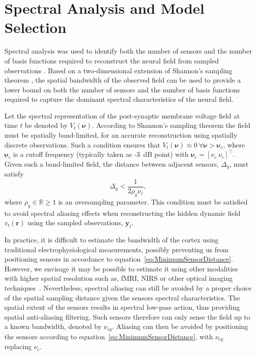 \documentclass[10pt,a4paper]{article}
\begin{document}
\section{Spectral Analysis and Model Selection}\label{SpectralAnalysisSection} Spectral analysis was used to identify both the number of sensors and the number of basis functions required to reconstruct the neural field from sampled observations \cite{Sanner1992,Scerri2009}. Based on a two-dimensional extension of Shannon's sampling theorem \cite{Peterson1962}, the spatial bandwidth of the observed field can be used to provide a lower bound on both the number of sensors and the number of basis functions required to capture the dominant spectral characteristics of the neural field.

Let the spectral representation of the post-synaptic membrane voltage field at time $t$ be denoted by $V_t(\boldsymbol{\nu})$. According to Shannon's sampling theorem the field must be spatially band-limited, for an accurate reconstruction using spatially discrete observations. Such a condition ensures that $V_t(\boldsymbol{\nu}) \approx 0 ~ \forall \boldsymbol{\nu} > \boldsymbol{\nu}_c$, where $\boldsymbol{\nu}_c$ is a cutoff frequency (typically taken as -3~dB point) with $\boldsymbol{\nu}_c = [\nu_c ~ \nu_c]^\top$. Given such a band-limited field, the distance between adjacent sensors, $\Delta_y$, must satisfy 
\begin{equation}
	\label{eq:MinimumSensorDistance} \Delta_y < \frac{1}{2\rho_y\nu_{c}}, 
\end{equation}
where $\rho_y \in \mathbb{R} \ge 1$ is an oversampling parameter. This condition must be satisfied to avoid spectral aliasing effects when reconstructing the hidden dynamic field $v_t(\mathbf{r})$ using the sampled observations, $\mathbf{y}_t$.

In practice, it is difficult to estimate the bandwidth of the cortex using traditional electrophysiological measurements, possibly preventing us from positioning sensors in accordance to equation~\ref{eq:MinimumSensorDistance}. However, we envisage it may be possible to estimate it using other modalities with higher spatial resolution such as, fMRI, NIRS or other optical imaging techniques~\cite{Issa2000}. Nevertheless, spectral aliasing can still be avoided by a proper choice of the spatial sampling distance given the sensors spectral characteristics. The spatial extent of the sensors results in spectral low-pass action, thus providing spatial anti-aliasing filtering. Such sensors therefore can only sense the field up to a known bandwidth, denoted by $\nu_{cy}$. Aliasing can then be avoided by positioning the sensors according to equation~\ref{eq:MinimumSensorDistance}, with $\nu_{cy}$ replacing $\nu_c$. 
\end{document}
